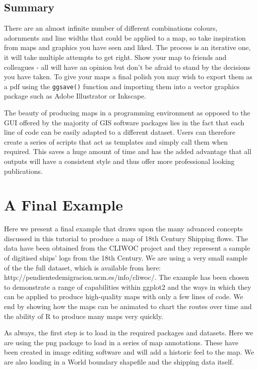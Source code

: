 \documentclass[]{article}
\begin{document}
\subsection{Summary}

There are an almost infinite number of different combinations colours,
adornments and line widths that could be applied to a map, so take
inspiration from maps and graphics you have seen and liked. The process
is an iterative one, it will take multiple attempts to get right. Show
your map to friends and colleagues - all will have an opinion but don't
be afraid to stand by the decisions you have taken. To give your maps a
final polish you may wish to export them as a pdf using the
\texttt{ggsave()} function and importing them into a vector graphics
package such as Adobe Illustrator or Inkscape.

The beauty of producing maps in a programming environment as opposed to
the GUI offered by the majority of GIS software packages lies in the
fact that each line of code can be easily adapted to a different
dataset. Users can therefore create a series of scripts that act as
templates and simply call them when required. This saves a huge amount
of time and has the added advantage that all outputs will have a
consistent style and thus offer more professional looking publications.

\section{A Final Example}

Here we present a final example that draws upon the many advanced
concepts discussed in this tutorial to produce a map of 18th Century
Shipping flows. The data have been obtained from the CLIWOC project and
they represent a sample of digitised ships' logs from the 18th Century.
We are using a very small sample of the the full dataset, which is
available from here: http://pendientedemigracion.ucm.es/info/cliwoc/.
The example has been chosen to demonstrate a range of capabilities
within ggplot2 and the ways in which they can be applied to produce
high-quality maps with only a few lines of code. We end by showing how
the maps can be animated to chart the routes over time and the ability
of R to produce many maps very quickly.

As always, the first step is to load in the required packages and
datasets. Here we are using the png package to load in a series of map
annotations. These have been created in image editing software and will
add a historic feel to the map. We are also loading in a World boundary
shapefile and the shipping data itself.
\end{document}
